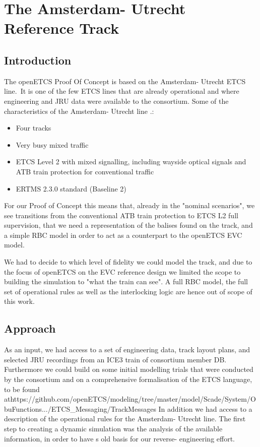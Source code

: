 \documentclass{template/openetcs_article}
\begin{document}
\section{The Amsterdam- Utrecht Reference Track}
\subsection{Introduction}

The openETCS Proof Of Concept is based on the Amsterdam- Utrecht ETCS line.\
It is one of the few ETCS lines that are already operational and where engineering and JRU data were available to the consortium.\newline
Some of the characteristics of the Amsterdam- Utrecht line  \cite{muttram08}.:
\begin{itemize}
 \item Four tracks
 \item Very busy mixed traffic
 \item ETCS Level 2 with mixed signalling, including wayside optical signals and ATB train protection for conventional traffic
 \item ERTMS 2.3.0 standard (Baseline 2)
\end{itemize}

For our Proof of Concept this means that, already in the "nominal scenarios", we see transitions from the conventional ATB train protection to ETCS L2 full supervision, that we need a representation of the balises found on the track, and a simple RBC model in order to act as a counterpart to the openETCS EVC model.

We had to decide to which level of fidelity we could model the track, and due to the focus of openETCS on the EVC reference design we limited the scope to building the simulation to "what the train can see".\newline
A full RBC model, the full set of operational rules as well as the interlocking logic are hence out of scope of this work.\newline


\subsection{Approach}

As an input, we had access to a set of engineering data, track layout plans, and selected JRU recordings from an ICE3 train of consortium member DB. Furthermore we could build on some initial modelling trials that were conducted by the consortium and on a comprehensive formalisation of the ETCS language, to be found at\newline https://github.com/openETCS/modeling/tree/master/model/Scade/System/ObuFunctions\newline .../ETCS\_Messaging/TrackMessages\newline
In addition we had access to a description of the operational rules for the Amsterdam- Utrecht line.
The first step to creating a dynamic simulation was the analysis of the available information, in order to have s old basis for our reverse- engineering effort.
\end{document}
